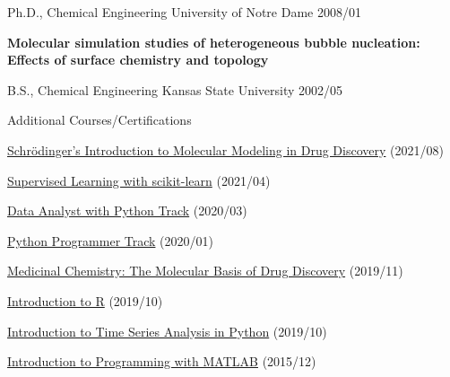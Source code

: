 
\begin{cventries}
  \cventry
    {Ph.D., Chemical Engineering} %
    {University of Notre Dame} %
    {} %
    {2008/01} %
    {
      \begin{cvitems} %
         \item {\textbf{Molecular simulation studies of heterogeneous bubble nucleation:  Effects of surface chemistry and topology}}
      \end{cvitems}
    }
    
    \cventry
      {B.S., Chemical Engineering}
      {Kansas State University}
      {}
      {2002/05}
      {}

  \vspace{-10pt}
      
  \cventry
    {}
    {Additional Courses/Certifications}
    {}
    {}
    {
        \begin{cvitems}
            \item{\href{https://api.badgr.io/public/assertions/zZ7-bHnkTcm6H_UNr2s-LA}{Schrödinger's Introduction to Molecular Modeling in Drug Discovery} (2021/08)}
            \item{\href{https://www.datacamp.com/statement-of-accomplishment/course/1d208c883d4173c2443a9ff695432cbe3881a882}{Supervised Learning with scikit-learn} (2021/04)}
            \item{\href{https://www.datacamp.com/statement-of-accomplishment/track/7171f97d35d807ece49c6e38c3d945583d4ae9dd}{Data Analyst with Python Track} (2020/03)}
            \item{\href{https://www.datacamp.com/statement-of-accomplishment/track/546928503f3ccea8a2ef53a6040f43997381f967}{Python Programmer Track} (2020/01)}
            \item{\href{https://courses.edx.org/certificates/27307d91954041dab94af0ff554bc378}{Medicinal Chemistry: The Molecular Basis of Drug Discovery} (2019/11)}
            \item{\href{https://www.datacamp.com/statement-of-accomplishment/course/dd5746b9564cf374bcc0bb379e1801925e25259e}{Introduction to R} (2019/10)}
            \item {\href{https://www.datacamp.com/statement-of-accomplishment/course/807548ea866063da3c0083afcebf3be48d44f277}{Introduction to Time Series Analysis in Python} (2019/10)}
            \item {\href{https://www.coursera.org/account/accomplishments/verify/9G7V69L6QP}{Introduction to Programming with MATLAB} (2015/12)}
        \end{cvitems}      
    }

\end{cventries}
